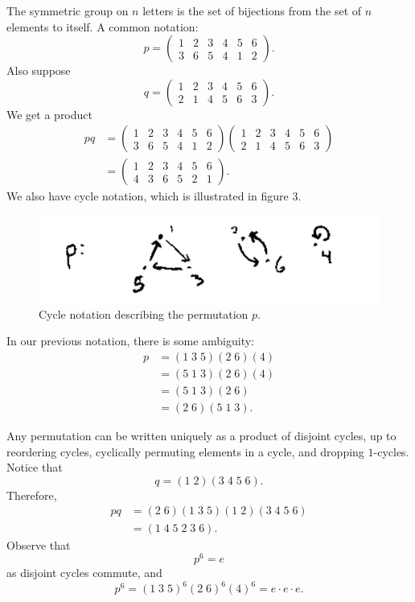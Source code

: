 \documentclass[11pt, oneside]{amsart}
\numberwithin{equation}{section}
\numberwithin{theorem}{section}
\theoremstyle{definition}
\begin{document}
{The symmetric group on $n$ letters is the set of bijections from the set of $n$ elements to itself. A common notation:
$$
p =\left(\begin{array}{cccccc} 1 & 2&3&4&5&6\\3&6&5&4&1&2\end{array}\right).
$$
Also suppose 
$$
q =\left(\begin{array}{cccccc} 1 & 2&3&4&5&6\\2&1&4&5&6&3\end{array}\right).
$$ 
We get a product
\begin{align*}
pq 	&= \left(\begin{array}{cccccc} 1 & 2&3&4&5&6\\3&6&5&4&1&2\end{array}\right)\left(\begin{array}{cccccc} 1 & 2&3&4&5&6\\2&1&4&5&6&3\end{array}\right)\\
	&= \left(\begin{array}{cccccc} 1 & 2&3&4&5&6\\4&3&6&5&2&1\end{array}\right).
\end{align*}
We also have cycle notation, which is illustrated in figure $3$.
\begin{figure}
\centering
\includegraphics[scale=0.5]{images/cycle_notation}
\caption{Cycle notation describing the permutation $p$.}
\end{figure}

In our previous notation, there is some ambiguity:
\begin{align*}
p 	&= (1\;3\;5)(2\;6)(4)\\
	&= (5\;1\;3)(2\;6)(4)\\
	&= (5\;1\;3)(2\;6)\\
	&= (2\;6)(5\;1\;3).
\end{align*}

Any permutation can be written uniquely as a product of disjoint cycles, up to reordering cycles, cyclically permuting elements in a cycle, and dropping $1$-cycles. Notice that
$$
q = (1\;2)(3\;4\;5\;6).
$$
Therefore,
\begin{align*}
pq 	&= (2\;6)(1\;3\;5)(1\;2)(3\;4\;5\;6)\\
	&= (1\;4\;5\;2\;3\;6).
\end{align*}
Observe that 
$$
p^6 = e
$$
as disjoint cycles commute, and 
$$
p^6 = (1\;3\;5)^6(2\;6)^6(4)^6 = e\cdot e\cdot e.
$$

}
\end{document}
